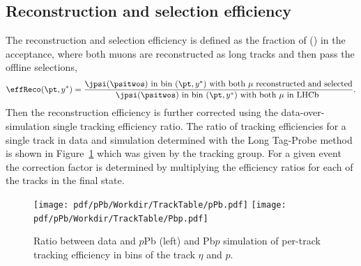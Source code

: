  \subsection{Reconstruction and selection efficiency}
 The reconstruction and selection efficiency is defined as the fraction of \jpsi (\psitwos) in the acceptance, where both muons are reconstructed as long tracks and then pass the offline selections,
 \begin{equation}
    \effReco(\pt,y^*)=\frac{\jpsi(\psitwos) \mathrm{ \ in \  bin \ } (\pt,y^*) \mathrm{ \ with  \ both \ } \mu \mathrm{ \ reconstructed \ and \ selected}}{\jpsi(\psitwos) \mathrm{ \ in \  bin \ } (\pt,y^*) \mathrm{ \ with  \ both \ } \mu \mathrm{ \ in \  LHCb \ }}.
\end{equation}
%
Then the reconstruction efficiency is further corrected using the data-over-simulation single tracking efficiency ratio. The ratio of tracking efficiencies for a single track in data and simulation determined with the Long Tag-Probe method is shown in Figure~\ref{TrackTable} which was given by the tracking group. For a given event the correction factor is determined by multiplying the efficiency ratios for each of the tracks in the final state.
\begin{figure}[!tbp]
\begin{center}
\texttt{[image: pdf/pPb/Workdir/TrackTable/pPb.pdf]}
\texttt{[image: pdf/pPb/Workdir/TrackTable/Pbp.pdf]}
\end{center}
	\caption{Ratio between data and $p$Pb (left) and Pb$p$ simulation of per-track tracking efficiency in bins of the track $\eta$ and $p$.
    }
\label{TrackTable}
\end{figure}

